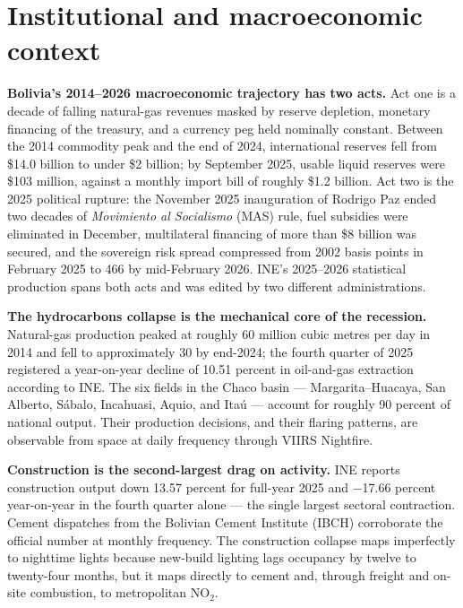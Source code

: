 \documentclass[11pt,letterpaper]{article}
\newcommand{\claim}[1]{\textbf{#1.}}
\begin{document}
\section{Institutional and macroeconomic context}
\label{sec:context}

\claim{Bolivia's \numrange{2014}{2026} macroeconomic trajectory has two acts} Act one is a decade of falling natural-gas revenues masked by reserve depletion, monetary financing of the treasury, and a currency peg held nominally constant. Between the \num{2014} commodity peak and the end of \num{2024}, international reserves fell from \$\num{14.0} billion to under \$\num{2} billion; by September \num{2025}, usable liquid reserves were \$\num{103} million, against a monthly import bill of roughly \$\num{1.2} billion. Act two is the \num{2025} political rupture: the November \num{2025} inauguration of Rodrigo Paz ended two decades of \emph{Movimiento al Socialismo} (MAS) rule, fuel subsidies were eliminated in December, multilateral financing of more than \$\num{8} billion was secured, and the sovereign risk spread compressed from \num{2002} basis points in February \num{2025} to \num{466} by mid-February \num{2026}. INE's \numrange{2025}{2026} statistical production spans both acts and was edited by two different administrations.

\claim{The hydrocarbons collapse is the mechanical core of the recession} Natural-gas production peaked at roughly \num{60} million cubic metres per day in \num{2014} and fell to approximately \num{30} by end-\num{2024}; the fourth quarter of \num{2025} registered a year-on-year decline of \num{10.51} percent in oil-and-gas extraction according to INE. The six fields in the Chaco basin --- Margarita--Huacaya, San Alberto, Sábalo, Incahuasi, Aquio, and Itaú --- account for roughly \num{90} percent of national output. Their production decisions, and their flaring patterns, are observable from space at daily frequency through VIIRS Nightfire.

\claim{Construction is the second-largest drag on activity} INE reports construction output down \num{13.57} percent for full-year \num{2025} and \num{-17.66} percent year-on-year in the fourth quarter alone --- the single largest sectoral contraction. Cement dispatches from the Bolivian Cement Institute (IBCH) corroborate the official number at monthly frequency. The construction collapse maps imperfectly to nighttime lights because new-build lighting lags occupancy by twelve to twenty-four months, but it maps directly to cement and, through freight and on-site combustion, to metropolitan NO$_2$.
\end{document}
